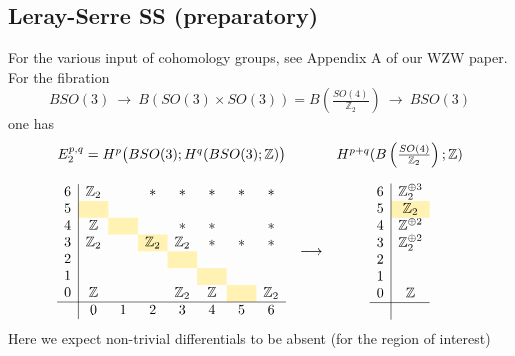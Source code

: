 \documentclass[12pt]{article}
\numberwithin{equation}{section}
\def\bZ{\mathbb{Z}}
\begin{document}
\subsection{Leray-Serre SS (preparatory)}
For the various input of cohomology groups, see Appendix A of our WZW paper.
For the fibration
\begin{equation}
	BSO(3)
	\ \to\ 
	B\left(SO(3)\times SO(3)\right)
	=
	B\left(\tfrac{SO(4)}{\bZ_2}\right)
	\ \to\ 
	BSO(3)
\end{equation}
one has
\begin{equation}
	\begin{array}{ccc}
		E_2^{p,q}=H^p\big(BSO(3);H^q(BSO(3);\bZ)\big) && H^{p+q}(B\left(\tfrac{SO(4)}{\bZ_2}\right);\bZ)\vspace{4mm}\\
		\begin{array}{c|ccccccccccccc}
			6 & \bZ_2 && \ast & \ast & \ast & \ast & \ast \\
			5  & \hphantom{\bZ_2}\cellcolor{lightyellow} & \hphantom{\bZ_2} & \hphantom{\bZ_2} & \hphantom{\bZ_2} & \hphantom{\bZ_2} & \hphantom{\bZ_2} \\
			4  & \bZ & \cellcolor{lightyellow} && \ast & \ast && \ast\\
			3  & \bZ_2 && \bZ_2\cellcolor{lightyellow} & \bZ_2 & \ast & \ast & \ast \\
			2  & &  && \cellcolor{lightyellow} &&\\
			1  &  &&  && \cellcolor{lightyellow} &&\\
			0 & \bZ &  && \bZ_2 & \bZ & \cellcolor{lightyellow} & \bZ_2\\
			\hline
			& 0 & 1 & 2 & 3 & 4 & 5 & 6 \\
		\end{array}
		& \longrightarrow & 
		\begin{array}{c|c}
			6  &\bZ_2^{\oplus 3}\\
			5  & \bZ_2\cellcolor{lightyellow}\\
			4  & \bZ^{\oplus 2}\\
			3  & \bZ_2^{\oplus 2}\\
			2  & \\
			1  & \\
			0 & \bZ\\
			\hline\\
		\end{array}
	\end{array}
\end{equation}
Here we expect non-trivial differentials to be absent (for the region of interest)
\end{document}
